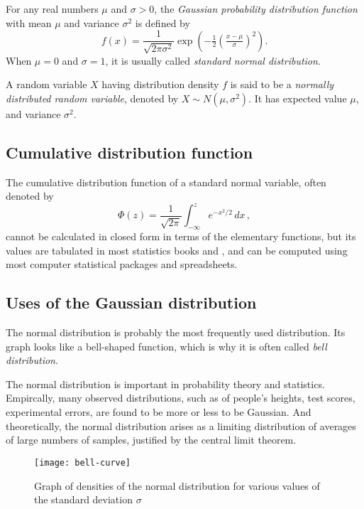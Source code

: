 \documentclass[12pt]{article}
\begin{document}


For any real numbers $\mu$ and $\sigma > 0$, the
\emph{Gaussian probability distribution function} 
with mean $\mu$ and variance $\sigma^2$ is defined by
\[
f(x) = \frac{1}{\sqrt{2 \pi \sigma^2}} 
\exp \left( - \tfrac12 \left( \tfrac{x - \mu}{\sigma} \right) ^2 \right).
\]
When $\mu=0$ and $\sigma = 1$, 
it is usually called \emph{standard normal distribution}.

A random variable $X$ having distribution density $f$ is said to be a 
\emph{normally distributed random variable}, denoted by $X\sim N(\mu,\sigma^2)$. 
It has expected value $\mu$, 
and variance $\sigma^2$. 

\subsection*{Cumulative distribution function}

The cumulative distribution function of a standard normal variable,
often denoted by
\[
\Phi(z) = \frac{1}{\sqrt{2\pi}} \int_{-\infty}^z e^{-x^2/2} \, dx\,,
\]
cannot be calculated in closed form in terms of the elementary functions,
but its values are tabulated in most statistics books and ,
and can be computed using most computer statistical packages and spreadsheets.

\subsection*{Uses of the Gaussian distribution}

The normal distribution is probably the most frequently used distribution. 
Its graph looks like a bell-shaped function, which is why it is often 
called \emph{bell distribution}. 

The normal distribution is important in probability theory and statistics.
Empircally, many observed distributions, 
such as of people's heights, test scores, 
experimental errors, are found to be more or less to be Gaussian.
And theoretically, the normal distribution arises as a limiting
distribution of averages of large numbers of samples, justified 
by the central limit theorem.

\begin{figure}
\texttt{[image: bell-curve]}
\caption{Graph of densities of the normal 
distribution for various values of the standard deviation $\sigma$}
\end{figure}
\end{document}
